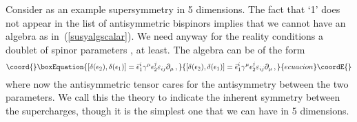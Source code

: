 \documentclass[a4paper,11pt,twoside]{article}
\providecommand{\SU}{\mathop{\rm SU}}
\providecommand{\USp}{\mathop{\rm {}USp}}
\begin{document}
Consider as an example supersymmetry in 5 dimensions. The fact that `1'
does not appear in the list of antisymmetric bispinors implies that we
cannot have an algebra as in~(\ref{susyalgscalar}). We need anyway for
the reality conditions a doublet of spinor parameters \coordHE{},
\coordHE{} at least. The algebra can be of the form
\begin{equation}\coord{}\boxEquation{
  \left[\delta (\epsilon _2),\delta (\epsilon _1)\right] =\bar \epsilon _1^i\gamma ^\mu
\epsilon _2^j\varepsilon _{ij}\partial _\mu\,,
 \label{susyalgD5}
}{
  \left[\delta (\epsilon _2),\delta (\epsilon _1)\right] =\bar \epsilon _1^i\gamma ^\mu
\epsilon _2^j\varepsilon _{ij}\partial _\mu\,,
 }{ecuacion}\coordE{}\end{equation}
where now the antisymmetric tensor \coordHE{} cares for the
antisymmetry between the two parameters. We call this the \coordHE{} theory to
indicate the inherent symmetry \myHighlight{$\USp(2)=\SU(2)$}\coordHE{} between the supercharges,
though it is the simplest one that we can have in 5 dimensions.
\end{document}
